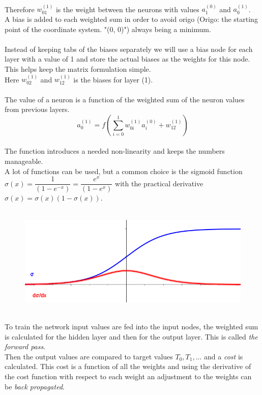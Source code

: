 \documentclass{article}
\begin{document}
\\
Therefore $w_{01}^{(1)}$ is the weight between the neurons with values $a_1^{(0)}$ and $a_0^{(1)}$.
\\
A bias is added to each weighted sum in order to avoid origo (Origo: the starting point of the coordinate system. "(0, 0)") always being a minimum.
\\
\\
Instead of keeping tabs of the biases separately we will use a bias node for each layer with a value of 1 and store the actual biases as the weights for this node. This helps keep the matrix formulation simple.
\\
Here $w_{02}^{(1)}$ and $w_{12}^{(1)}$ is the biases for layer (1).
\\
\\ 
The value of a neuron is a function of the weighted sum of the neuron values from previous layers. $$a_0^{(1)} = f(\sum_{i=0}^{1}{w_{0i}^{(1)}a_i^{(0)}}+w_{12}^{(1)})$$
\\
The function introduces a needed non-linearity and keeps the numbers manageable.
\\
A lot of functions can be used, but a common choice is the sigmoid function $\sigma(x) = \dfrac{1}{(1-e^{-x})} = \dfrac{e^{x}}{(1-e^{x})}$ with the practical derivative $\sigma(x) = \sigma(x)(1 - \sigma(x)) $.
\\
\\
\begin{figure}[h]
\includegraphics[scale=.5]{sigmoid}
\centering
\end{figure}
\\
To train the network input values are fed into the input nodes, the weighted sum is calculated for the hidden layer and then for the output layer. This is called \textit{the forward pass}.
\\
Then the output values are compared to target values $T_0, T_1, ...$ and a \textit{cost} is calculated. This cost is a function of all the weights and using the derivative of the cost function with respect to each weight an adjustment to the weights can be \textit{back propagated}.
\\
\end{document}
